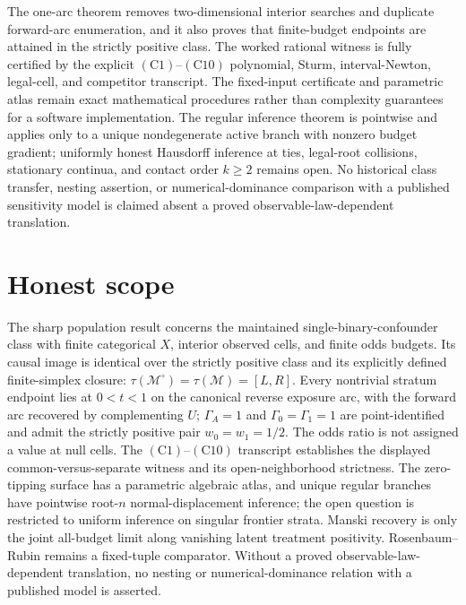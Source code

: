 \documentclass{article}
\begin{document}
The one-arc theorem removes two-dimensional interior searches and duplicate forward-arc enumeration, and it also proves that finite-budget endpoints are attained in the strictly positive class.  The worked rational witness is fully certified by the explicit \((\mathrm{C1})\)--\((\mathrm{C10})\) polynomial, Sturm, interval-Newton, legal-cell, and competitor transcript.  The fixed-input certificate and parametric atlas remain exact mathematical procedures rather than complexity guarantees for a software implementation.  The regular inference theorem is pointwise and applies only to a unique nondegenerate active branch with nonzero budget gradient; uniformly honest Hausdorff inference at ties, legal-root collisions, stationary continua, and contact order \(k\geq2\) remains open.  No historical class transfer, nesting assertion, or numerical-dominance comparison with a published sensitivity model is claimed absent a proved observable-law-dependent translation.

\section{Honest scope}

The sharp population result concerns the maintained single-binary-confounder class with finite categorical \(X\), interior observed cells, and finite odds budgets.  Its causal image is identical over the strictly positive class and its explicitly defined finite-simplex closure: \(\tau(\mathcal M^{\circ})=\tau(\mathcal M)=[L,R]\).  Every nontrivial stratum endpoint lies at \(0<t<1\) on the canonical reverse exposure arc, with the forward arc recovered by complementing \(U\); \(\Gamma_A=1\) and \(\Gamma_0=\Gamma_1=1\) are point-identified and admit the strictly positive pair \(w_0=w_1=1/2\).  The odds ratio is not assigned a value at null cells.  The \((\mathrm{C1})\)--\((\mathrm{C10})\) transcript establishes the displayed common-versus-separate witness and its open-neighborhood strictness.  The zero-tipping surface has a parametric algebraic atlas, and unique regular branches have pointwise root-\(n\) normal-displacement inference; the open question is restricted to uniform inference on singular frontier strata.  Manski recovery is only the joint all-budget limit along vanishing latent treatment positivity.  Rosenbaum--Rubin remains a fixed-tuple comparator.  Without a proved observable-law-dependent translation, no nesting or numerical-dominance relation with a published model is asserted.
\end{document}
